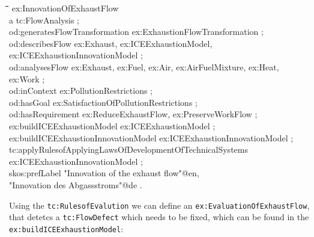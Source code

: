 \documentclass[a4paper,11pt]{article}
\newenvironment{code}{\tt \begin{tabbing}
\hskip12pt\=\hskip12pt\=\hskip12pt\=\hskip12pt\=\hskip5cm\=\hskip5cm\=\kill}
{\end{tabbing}}
\begin{document}
\begin{code}
ex:InnovationOfExhaustFlow \\
\> a tc:FlowAnalysis ; \\
\> od:generatesFlowTransformation ex:ExhaustionFlowTransformation ; \\
\> od:describesFlow ex:Exhaust, ex:ICEExhaustionModel,  \\
\> ex:ICEExhaustionInnovationModel ; \\
\> od:analysesFlow ex:Exhaust, ex:Fuel, ex:Air, ex:AirFuelMixture, ex:Heat, \\
\>\> ex:Work ; \\
\> od:inContext ex:PollutionRestrictions ; \\
\> od:hasGoal ex:SatisfactionOfPollutionRestrictions ; \\
\> od:hasRequirement ex:ReduceExhaustFlow, ex:PreserveWorkFlow ; \+\\
\> ex:buildICEExhaustionModel ex:ICEExhaustionModel ; \\
\> ex:buildICEExhaustionInnovationModel ex:ICEExhaustionInnovationModel ; \-\\
\> tc:applyRulesofApplyingLawsOfDevelopmentOfTechnicalSystems  \\
\>\> ex:ICEExhaustionInnovationModel ; \\
\> skos:prefLabel "Innovation of the exhaust flow"@en,\\
\>\> "Innovation des Abgassstroms"@de .
\end{code}

Using the \texttt{tc:RulesofEvalution} we can define an
\texttt{ex:EvaluationOfExhaustFlow}, that detetcs a \texttt{tc:FlowDefect}
which needs to be fixed, which can be found in the
\texttt{ex:buildICE\-Exhaustion\-Model}:
\end{document}
